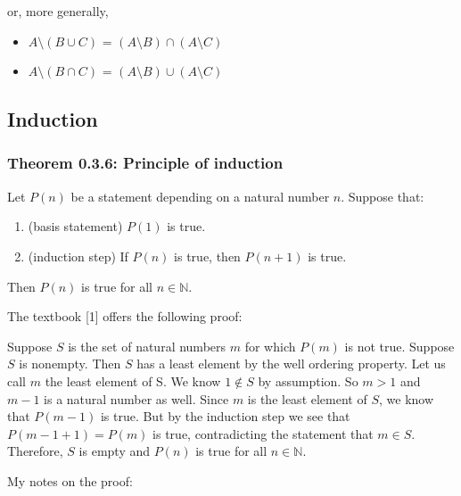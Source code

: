 \documentclass[12pt, letterpaper, oneside]{book}
\begin{document}
or, more generally,

\begin{itemize}
  \item $A \setminus (B \cup C)$ = $(A \setminus B) \cap (A \setminus C)$
  \item $A \setminus (B \cap C)$ = $(A \setminus B) \cup (A \setminus C)$
\end{itemize}

\subsection{Induction}

\subsubsection{Theorem 0.3.6: Principle of induction}

Let $P(n)$ be a statement depending on a natural number $n$. Suppose that:

\begin{enumerate}
  \item (basis statement) $P(1)$ is true.
  \item (induction step) If $P(n)$ is true, then $P(n+1)$ is true.
\end{enumerate}

Then $P(n)$ is true for all $n \in \mathbb{N}$.

The textbook [1] offers the following proof:

\begin{displayquote}
  Suppose $S$ is the set of natural numbers $m$ for which $P(m)$ is not true.
  Suppose $S$ is nonempty. Then $S$ has a least element by the well ordering
  property. Let us call $m$ the least element of S. We know $1 \notin S$ by
  assumption. So $m > 1$ and $m - 1$ is a natural number as well. Since $m$ is
  the least element of $S$, we know that $P(m-1)$ is true. But by the induction
  step we see that $P(m-1+1) = P(m)$ is true, contradicting the statement that
  $m \in S$. Therefore, $S$ is empty and $P(n)$ is true for all $n \in
  \mathbb{N}$.
\end{displayquote}

My notes on the proof:
\end{document}
